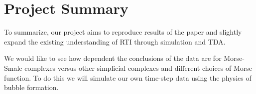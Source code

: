 \documentclass[12pt, fullpage,letterpaper]{article}
\begin{document}
	\section*{\normalfont Project Summary}  
%		
%		
%		
%		
%		
	To summarize, our project aims to reproduce results of the paper and slightly expand the existing understanding of RTI through simulation and TDA. 
	
	We would like to see how dependent the conclusions of the data are for Morse-Smale complexes versus other simplicial complexes and different choices of Morse function. To do this we will simulate our own time-step data using the physics of bubble formation. 
\end{document}
